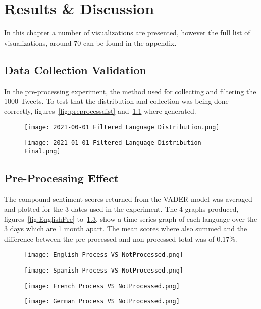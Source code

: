 \chapter{Results \& Discussion}

In this chapter a number of visualizations are presented, however the full list of visualizations, around 70 can be found in the appendix.

\section{Data Collection Validation}

In the pre-processing experiment, the method used for collecting and filtering the 1000 Tweets.
To test that the distribution and collection was being done correctly, figures~\ref{fig:preprocessdist} and~\ref{fig:finaldist} where generated.


\begin{figure}[!htb]
  \texttt{[image: 2021-00-01 Filtered Language Distribution.png]}
  \caption[Pre-Process Filtered Language Distribution]{ }
  \label{fig:preprocessdist}
\endminipage\hfill
{}
  \texttt{[image: 2021-01-01 Filtered Language Distribution - Final.png]}
  \caption[Final Filtered Language Distribution]{ }
  \label{fig:finaldist}
\endminipage
\end{figure}


\section{Pre-Processing Effect}

The compound sentiment scores returned from the \ac{VADER} model was averaged and plotted for the 3 dates used in the experiment.
The 4 graphs produced, figures~\ref{fig:EnglishPre} to~\ref{fig:GermanPre}, show a time series graph of each language over the 3 days which are 1 month apart.
The mean scores where also summed and the difference between the pre-processed and non-processed total was of 0.17\%.

\begin{figure}[!htb]
  \texttt{[image: English Process VS NotProcessed.png]}
  \caption[English Process VS NotProcessed]{ }\label{fig:EnglishPre}
\endminipage\hfill
{}
  \texttt{[image: Spanish Process VS NotProcessed.png]}
  \caption[Spanish Process VS NotProcessed]{ }\label{fig:SpanishPre}
\endminipage
\end{figure}
\begin{figure}[!htb]
  \texttt{[image: French Process VS NotProcessed.png]}
  \caption[French Process VS NotProcessed]{ }\label{fig:FrenchPre}
\endminipage\hfill
{}
  \texttt{[image: German Process VS NotProcessed.png]}
  \caption[German Process VS NotProcessed]{ }\label{fig:GermanPre}
\endminipage
\end{figure}

